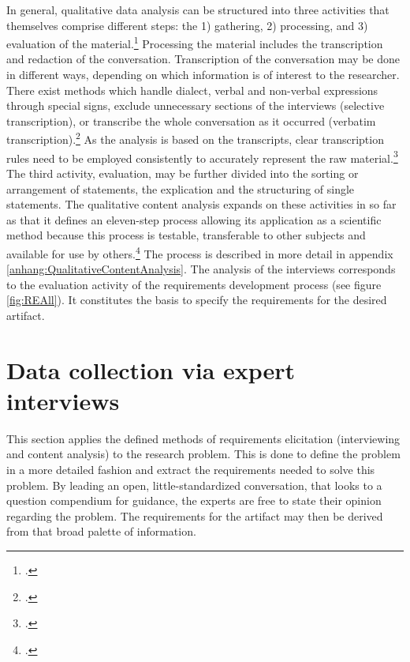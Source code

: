 In general, qualitative data analysis can be structured into three activities that themselves comprise different steps: the 1) gathering, 2) processing, and 3) evaluation of the material.\footcite[Cf.][p.135 et seqq]{KrugerqualitativeInhaltsanalyseMethode2004} Processing the material includes the transcription and redaction of the conversation. Transcription of the conversation may be done in different ways, depending on which information is of interest to the researcher. There exist methods which handle dialect, verbal and non-verbal expressions through special signs, exclude unnecessary sections of the interviews (selective transcription), or transcribe the whole conversation as it occurred (verbatim transcription).\footcite[Cf.][p.44 et seq]{MayringQualitativeContentAnalysis2014} As the analysis is based on the transcripts, clear transcription rules need to be employed consistently to accurately represent the raw material.\footcite[Cf.][p.44]{MayringQualitativeContentAnalysis2014} The third activity, evaluation, may be further divided into the sorting or arrangement of statements, the explication and the structuring of single statements. The qualitative content analysis expands on these activities in so far as that it defines an eleven-step process allowing its application as a scientific method because this process is testable, transferable to other subjects and available for use by others.\footcite[Cf.][p.53]{MayringQualitativeContentAnalysis2014} The process is described in more detail in appendix \ref{anhang:QualitativeContentAnalysis}. The analysis of the interviews corresponds to the evaluation activity of the requirements development process (see figure \ref{fig:REAll}). It constitutes the basis to specify the requirements for the desired artifact. 

\section{Data collection via expert interviews}
This section applies the defined methods of requirements elicitation (interviewing and content analysis) to the research problem. This is done to define the problem in a more detailed fashion and extract the requirements needed to solve this problem. By leading an open, little-standardized conversation, that looks to a question compendium for guidance, the experts are free to state their opinion regarding the problem. The requirements for the artifact may then be derived from that broad palette of information.

